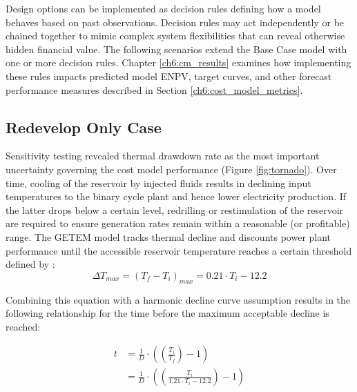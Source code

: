 Design options can be implemented as decision rules defining how a model behaves based on past observations. Decision rules may act independently or be chained together to mimic complex system flexibilities that can reveal otherwise hidden financial value. The following scenarios extend the Base Case model with one or more decision rules. Chapter \ref{ch6:cm_results} examines how implementing these rules impacts predicted model ENPV, target curves, and other forecast performance measures described in Section \ref{ch6:cost_model_metrics}.

\subsection{Redevelop Only Case}\label{ch4:flex_redevelop_case}
Sensitivity testing revealed thermal drawdown rate as the most important uncertainty governing the cost model performance (Figure \ref{fig:tornado}). Over time, cooling of the reservoir by injected fluids results in declining input temperatures to the binary cycle plant and hence lower electricity production. If the latter drops below a certain level, redrilling or restimulation of the reservoir are required to ensure generation rates remain within a reasonable (or profitable) range. The GETEM model tracks thermal decline and discounts power plant performance until the accessible reservoir temperature reaches a certain threshold defined by \citep{entingh_volume_2006}:
\begin{equation}
\label{eq:drawdown_threshold}
    \Delta T_{max} = (T_f-T_i)_{max} = 0.21 \cdot T_i - 12.2
\end{equation}

Combining this equation with a harmonic decline curve assumption results in the following relationship for the time before the maximum acceptable decline is reached:

\begin{equation}
\label{eq:redevelop_time}
\begin{aligned}
    t &= \frac{1}{D} \cdot 
    \left( {
    \left( {\frac{T_i}{T_f} }\right) - 1
    }\right)\\
    &= \frac{1}{D} \cdot 
    \left( {
    \left( {\frac{T_i}{1.21 \cdot T_i - 12.2}
    }\right) - 1
    }\right) 
\end{aligned}
\end{equation}

